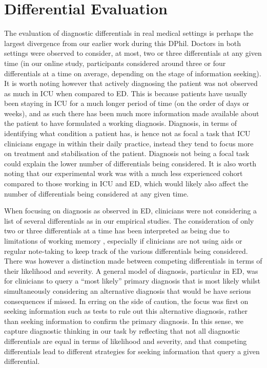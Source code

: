 \documentclass[a4paper, nobind]{templates/ociamthesis}
\begin{document}
\section*{Differential Evaluation}\label{differential-evaluation}

The evaluation of diagnostic differentials in real medical settings is perhaps the largest divergence from our earlier work during this DPhil. Doctors in both settings were observed to consider, at most, two or three differentials at any given time (in our online study, participants considered around three or four differentials at a time on average, depending on the stage of information seeking). It is worth noting however that actively diagnosing the patient was not observed as much in ICU when compared to ED. This is because patients have usually been staying in ICU for a much longer period of time (on the order of days or weeks), and as such there has been much more information made available about the patient to have formulated a working diagnosis. Diagnosis, in terms of identifying what condition a patient has, is hence not as focal a task that ICU clinicians engage in within their daily practice, instead they tend to focus more on treatment and stabilisation of the patient. Diagnosis not being a focal task could explain the lower number of differentials being considered. It is also worth noting that our experimental work was with a much less experienced cohort compared to those working in ICU and ED, which would likely also affect the number of differentials being considered at any given time.

\hfill\break
When focusing on diagnosis as observed in ED, clinicians were not considering a list of several differentials as in our empirical studies. The consideration of only two or three differentials at a time has been interpreted as being due to limitations of working memory \autocite{gilhooly_cognitive_1990}, especially if clinicians are not using aids or regular note-taking to keep track of the various differentials being considered. There was however a distinction made between competing differentials in terms of their likelihood and severity. A general model of diagnosis, particular in ED, was for clinicians to query a ``most likely'' primary diagnosis that is most likely whilst simultaneously considering an alternative diagnosis that would be have serious consequences if missed. In erring on the side of caution, the focus was first on seeking information such as tests to rule out this alternative diagnosis, rather than seeking information to confirm the primary diagnosis. In this sense, we capture diagnostic thinking in our task by reflecting that not all diagnostic differentials are equal in terms of likelihood and severity, and that competing differentials lead to different strategies for seeking information that query a given differential.
\end{document}
